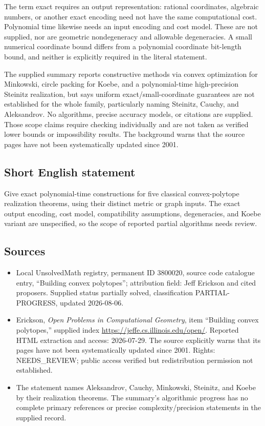 \documentclass[11pt]{article}
\begin{document}
The term exact requires an output representation: rational coordinates, algebraic numbers, or another exact encoding need not have the same computational cost. Polynomial time likewise needs an input encoding and cost model. These are not supplied, nor are geometric nondegeneracy and allowable degeneracies. A small numerical coordinate bound differs from a polynomial coordinate bit-length bound, and neither is explicitly required in the literal statement.

The supplied summary reports constructive methods via convex optimization for Minkowski, circle packing for Koebe, and a polynomial-time high-precision Steinitz realization, but says uniform exact/small-coordinate guarantees are not established for the whole family, particularly naming Steinitz, Cauchy, and Aleksandrov. No algorithms, precise accuracy models, or citations are supplied. Those scope claims require checking individually and are not taken as verified lower bounds or impossibility results. The background warns that the source pages have not been systematically updated since 2001.
\subsection{Short English statement}
Give exact polynomial-time constructions for five classical convex-polytope realization theorems, using their distinct metric or graph inputs. The exact output encoding, cost model, compatibility assumptions, degeneracies, and Koebe variant are unspecified, so the scope of reported partial algorithms needs review.
\subsection{Sources}
\begin{itemize}
\item Local UnsolvedMath registry, permanent ID 3800020, source code catalogue entry, ``Building convex polytopes''; attribution field: Jeff Erickson and cited proposers. Supplied status partially solved, classification PARTIAL-PROGRESS, updated 2026-08-06.
\item Erickson, \emph{Open Problems in Computational Geometry}, item ``Building convex polytopes,'' supplied index \url{https://jeffe.cs.illinois.edu/open/}. Reported HTML extraction and access: 2026-07-29. The source explicitly warns that its pages have not been systematically updated since 2001. Rights: NEEDS\_REVIEW; public access verified but redistribution permission not established.
\item The statement names Aleksandrov, Cauchy, Minkowski, Steinitz, and Koebe by their realization theorems. The summary's algorithmic progress has no complete primary references or precise complexity/precision statements in the supplied record.
\end{itemize}
\end{document}
